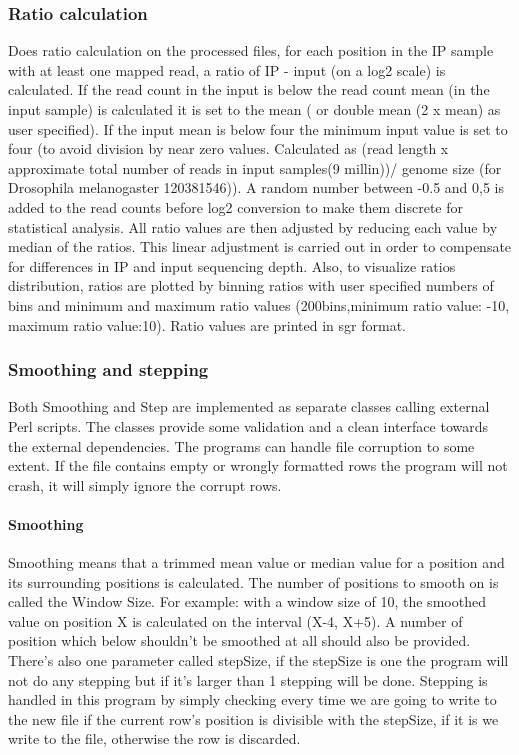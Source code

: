 \subsubsection{Ratio calculation}
Does ratio calculation on the processed files, for each position in the IP sample with at least one mapped read, a ratio of IP - input (on a log2 scale) is calculated. If the read count in the input is below the read count mean (in the input sample) is calculated it is set to the mean ( or double mean (2 x mean) as user specified). If the input mean is below four the minimum input value is set to four (to avoid division by near zero values. Calculated as (read length x approximate total number of reads in input samples(9 millin))/ genome size (for Drosophila melanogaster 120381546)). A random number between -0.5 and 0,5 is added to the read counts before log2 conversion to make them discrete for statistical analysis. All ratio values are then adjusted by reducing each value by median of the ratios. This linear adjustment is carried out in order to compensate for differences in IP and input sequencing depth. Also, to visualize ratios distribution, ratios are plotted by binning ratios with user specified numbers of bins and minimum and maximum ratio values (200bins,minimum ratio value: -10, maximum ratio value:10). Ratio values are printed in sgr format.

\subsubsection{Smoothing and stepping}
Both Smoothing and Step are implemented as separate classes calling external Perl scripts.
The classes provide some validation and a clean interface towards the external dependencies.
The programs can handle file corruption to some extent. 
If the file contains empty or wrongly formatted rows the program will not crash, it will simply ignore the corrupt rows.

\paragraph{Smoothing}
Smoothing means that a trimmed mean value or median value for a position and its surrounding positions is calculated. The number of positions to smooth on is called the Window Size. For example: with a window size of 10, the smoothed value on position X is calculated on the interval (X-4, X+5). A number of position which below shouldn't be smoothed at all should also be provided. There's also one parameter called stepSize, if the stepSize is one the program will not do any stepping but if it's larger than 1 stepping will be done. Stepping is handled in this program by simply checking every time we are going to write to the new file if the current row's position is divisible with the stepSize, if it is we write to the file, otherwise the row is discarded.

